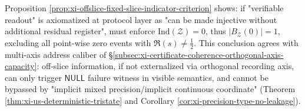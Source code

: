 \begin{remark}\label{rem:xi-offslice-protocol-consequence}
Proposition \ref{prop:xi-offslice-fixed-slice-indicator-criterion} shows: if "verifiable readout" is axiomatized at protocol layer as "can be made injective without additional residual register", must enforce \(\mathrm{Ind}(\mathcal Z)=0\), thus \(|B_{\mathcal Z}(0)|=1\), excluding all point-wise zero events with \(\Re(s)\neq\tfrac12\).
This conclusion agrees with multi-axis address caliber of \S\ref{subsec:xi-certificate-coherence-orthogonal-axis-capacity}: off-slice information, if not externalized via orthogonal recording axis, can only trigger \(\mathsf{NULL}\) failure witness in visible semantics, and cannot be bypassed by "implicit mixed precision/implicit continuous coordinate" (Theorem \ref{thm:xi-us-deterministic-tristate} and Corollary \ref{cor:xi-precision-type-no-leakage}).
\end{remark}

\endinput
